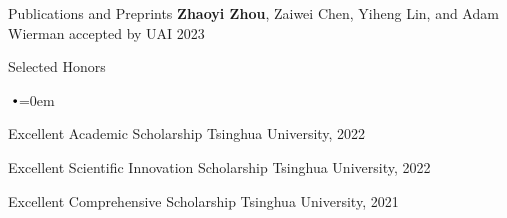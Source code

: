 \documentclass[]{cv}
\begin{document}






\begin{section}{Publications and Preprints}
    {\textbf{Zhaoyi Zhou}, Zaiwei Chen, Yiheng Lin, and Adam Wierman}
    {accepted by UAI 2023}
\end{section}

\begin{section}{Selected Honors}
    \begin{list}{$\vbullet$}{\leftmargin=0em}
        \item Excellent Academic Scholarship \hfill Tsinghua University, 2022
        \vspace{-0.5em}
        \item Excellent Scientific Innovation Scholarship \hfill Tsinghua University, 2022
        \vspace{-0.5em}
        \item Excellent Comprehensive Scholarship \hfill Tsinghua University, 2021
    \end{list}
\end{section}
\end{document}
